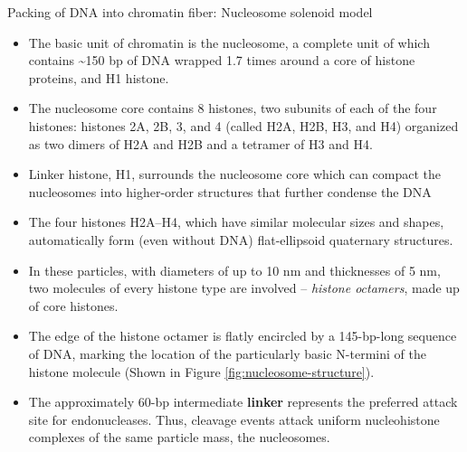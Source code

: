 \documentclass[11pt,dvipsnames,ignorenonframetext,aspectratio=169]{beamer}
\providecommand{\tightlist}{%
  \setlength{\itemsep}{0pt}\setlength{\parskip}{0pt}}
\begin{document}
\begin{frame}{Packing of DNA into chromatin fiber: Nucleosome solenoid
model}
\protect\hypertarget{packing-of-dna-into-chromatin-fiber-nucleosome-solenoid-model}{}
\small

\begin{itemize}
\tightlist
\item
  The basic unit of chromatin is the nucleosome, a complete unit of
  which contains \textasciitilde150 bp of DNA wrapped 1.7 times around a
  core of histone proteins, and H1 histone.
\item
  The nucleosome core contains 8 histones, two subunits of each of the
  four histones: histones 2A, 2B, 3, and 4 (called H2A, H2B, H3, and H4)
  organized as two dimers of H2A and H2B and a tetramer of H3 and H4.
\item
  Linker histone, H1, surrounds the nucleosome core which can compact
  the nucleosomes into higher-order structures that further condense the
  DNA
\item
  The four histones H2A--H4, which have similar molecular sizes and
  shapes, automatically form (even without DNA) flat-ellipsoid
  quaternary structures.
\item
  In these particles, with diameters of up to 10 nm and thicknesses of 5
  nm, two molecules of every histone type are involved -- \emph{histone
  octamers}, made up of core histones.
\item
  The edge of the histone octamer is flatly encircled by a 145-bp-long
  sequence of DNA, marking the location of the particularly basic
  N-termini of the histone molecule (Shown in Figure
  \ref{fig:nucleosome-structure}).
\item
  The approximately 60-bp intermediate \textbf{linker} represents the
  preferred attack site for endonucleases. Thus, cleavage events attack
  uniform nucleohistone complexes of the same particle mass, the
  nucleosomes.
\end{itemize}
\end{frame}
\end{document}
